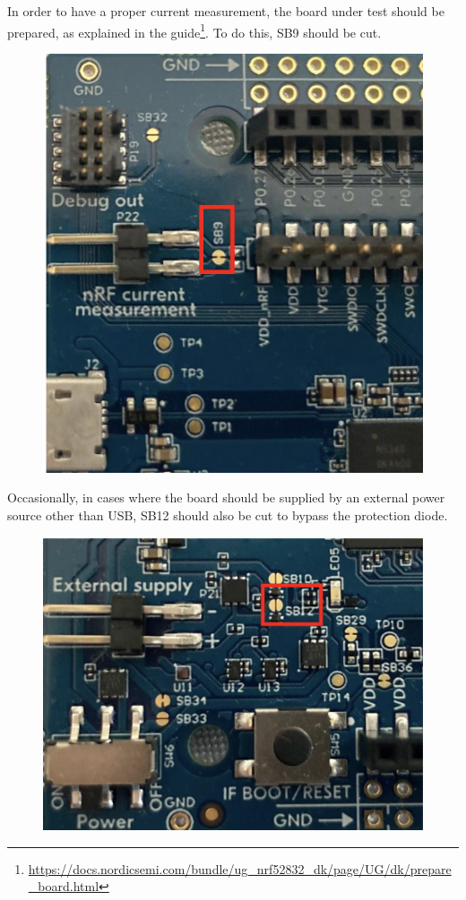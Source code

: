\documentclass{Configuration_Files/PoliMi3i_thesis}
\begin{document}
In order to have a proper current measurement, the board under test should be prepared, as explained in the guide\footnote{\url{https://docs.nordicsemi.com/bundle/ug_nrf52832_dk/page/UG/dk/prepare_board.html}}. To do this, SB9 should be cut.

\begin{figure}[h]
    \centering
    \includegraphics[scale=0.3]{Test_Procedure/15.png}
    \label{fig:SB9_solder_bridge}
\end{figure}

Occasionally, in cases where the board should be supplied by an external power source other than USB, SB12 should also be cut to bypass the protection diode.

\begin{figure}[h]
    \centering
    \includegraphics[scale=0.3]{Test_Procedure/16.png}
    \label{fig:SB12_solder_bridge}
\end{figure}
\end{document}
